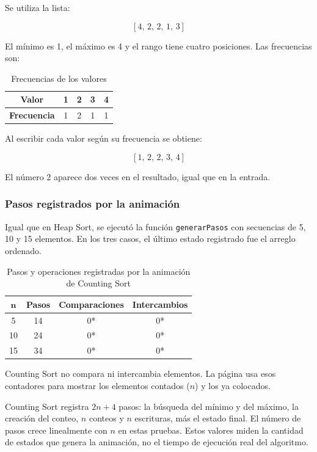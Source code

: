 \documentclass[11pt,letterpaper]{article}
\begin{document}
Se utiliza la lista:

\[
[4,\,2,\,2,\,1,\,3]
\]

El mínimo es 1, el máximo es 4 y el rango tiene cuatro posiciones. Las frecuencias son:

\begin{table}[H]
\centering
\caption{Frecuencias de los valores}
\begin{tabular}{ccccc}
\toprule
\textbf{Valor} & 1 & 2 & 3 & 4 \\
\midrule
\textbf{Frecuencia} & 1 & 2 & 1 & 1 \\
\bottomrule
\end{tabular}
\end{table}

Al escribir cada valor según su frecuencia se obtiene:

\[
\boxed{[1,\,2,\,2,\,3,\,4]}
\]

El número 2 aparece dos veces en el resultado, igual que en la entrada.

\subsubsection{Pasos registrados por la animación}

Igual que en Heap Sort, se ejecutó la función \texttt{generar\-Pasos} con secuencias de 5, 10 y 15 elementos. En los tres casos, el último estado registrado fue el arreglo ordenado.

\begin{table}[H]
\centering
\caption{Pasos y operaciones registradas por la animación de Counting Sort}
\begin{tabular}{cccc}
\toprule
\(\boldsymbol{n}\) & \textbf{Pasos} & \textbf{Comparaciones} & \textbf{Intercambios} \\
\midrule
5 & 14 & 0* & 0* \\
10 & 24 & 0* & 0* \\
15 & 34 & 0* & 0* \\
\bottomrule
\end{tabular}
\end{table}

\noindent *Counting Sort no compara ni intercambia elementos. La página usa esos contadores para mostrar los elementos contados (\(n\)) y los ya colocados.

Counting Sort registra \(2n+4\) pasos: la búsqueda del mínimo y del máximo, la creación del conteo, \(n\) conteos y \(n\) escrituras, más el estado final. El número de pasos crece linealmente con \(n\) en estas pruebas. Estos valores miden la cantidad de estados que genera la animación, no el tiempo de ejecución real del algoritmo.
\end{document}
